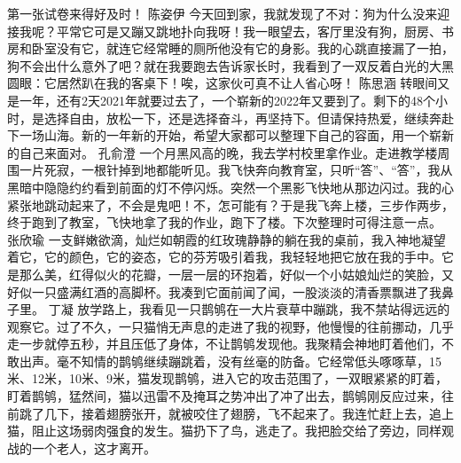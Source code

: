 {}第一张试卷来得好及时！\markdownRendererInterblockSeparator
{}\markdownRendererInterblockSeparator
{}陈姿伊\markdownRendererInterblockSeparator
{}今天回到家，我就发现了不对：狗为什么没来迎接我呢？平常它可是又蹦又跳地扑向我呀！我一眼望去，客厅里没有狗，厨房、书房和卧室没有它，就连它经常睡的厕所他没有它的身影。我的心跳直接漏了一拍，狗不会出什么意外了吧？就在我要跑去告诉家长时，我看到了一双反着白光的大黑圆眼：它居然趴在我的客桌下！唉，这家伙可真不让人省心呀！\markdownRendererInterblockSeparator
{}\markdownRendererInterblockSeparator
{}陈思涵\markdownRendererInterblockSeparator
{}转眼间又是一年，还有2天2021年就要过去了，一个崭新的2022年又要到了。剩下的48个小时，是选择自由，放松一下，还是选择奋斗，再坚持下。但请保持热爱，继续奔赴下一场山海。新的一年新的开始，希望大家都可以整理下自己的容面，用一个崭新的自己来面对。\markdownRendererInterblockSeparator
{}\markdownRendererInterblockSeparator
{}孔俞澄\markdownRendererInterblockSeparator
{}一个月黑风高的晚，我去学村校里拿作业。走进教学楼周围一片死寂，一根针掉到地都能听见。我飞快奔向教育室，只听“答”、“答”，我从黑暗中隐隐约约看到前面的灯不停闪烁。突然一个黑影飞快地从那边闪过。我的心紧张地跳动起来了，不会是鬼吧！不，怎可能有？于是我飞奔上楼，三步作两步，终于跑到了教室，飞快地拿了我的作业，跑下了楼。下次整理时可得注意一点。\markdownRendererInterblockSeparator
{}\markdownRendererInterblockSeparator
{}张欣瑜\markdownRendererInterblockSeparator
{}一支鲜嫩欲滴，灿烂如朝霞的红玫瑰静静的躺在我的桌前，我入神地凝望着它，它的颜色，它的姿态，它的芬芳吸引着我，我轻轻地把它放在我的手中。它是那么美，红得似火的花瓣，一层一层的环抱着，好似一个小姑娘灿烂的笑脸，又好似一只盛满红酒的高脚杯。我凑到它面前闻了闻，一股淡淡的清香票飘进了我鼻子里。\markdownRendererInterblockSeparator
{}\markdownRendererInterblockSeparator
{}丁凝\markdownRendererInterblockSeparator
{}放学路上，我看见一只鹊鸲在一大片衰草中蹦跳，我不禁站得远远的观察它。过了不久，一只猫悄无声息的走进了我的视野，他慢慢的往前挪动，几乎走一步就停五秒，并且压低了身体，不让鹊鸲发现他。我聚精会神地盯着他们，不敢出声。毫不知情的鹊鸲继续蹦跳着，没有丝毫的防备。它经常低头啄啄草，15米、12米，10米、9米，猫发现鹊鸲，进入它的攻击范围了，一双眼紧紧的盯着，盯着鹊鸲，猛然间，猫以迅雷不及掩耳之势冲出了冲了出去，鹊鸲刚反应过来，往前跳了几下，接着翅膀张开，就被咬住了翅膀，飞不起来了。我连忙赶上去，追上猫，阻止这场弱肉强食的发生。猫扔下了鸟，逃走了。我把脸交给了旁边，同样观战的一个老人，这才离开。\markdownRendererInterblockSeparator
